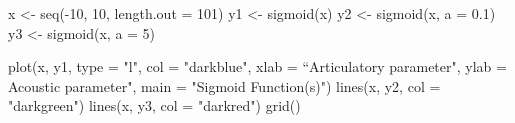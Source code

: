 \documentclass{article}
\begin{document}


x <- seq(-10, 10, length.out = 101)
y1 <- sigmoid(x)
y2 <- sigmoid(x, a = 0.1)
y3 <- sigmoid(x, a = 5)

plot(x, y1, type = "l", col = "darkblue", 
     xlab = ``Articulatory parameter", ylab = Acoustic parameter", main = "Sigmoid Function(s)")
lines(x, y2, col = "darkgreen")
lines(x, y3, col = "darkred")
grid()
\end{document}
